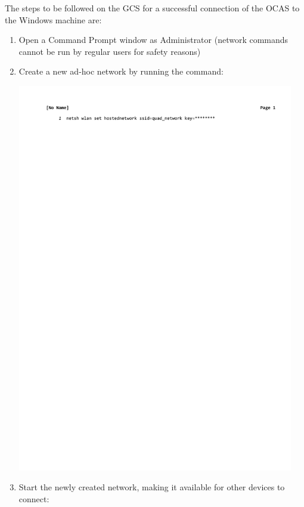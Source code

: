 The steps to be followed on the GCS for a successful connection of the OCAS to the Windows machine are:
\begin{enumerate}
	\item Open a Command Prompt window as Administrator (network commands cannot be run by regular users for safety reasons)

	\item Create a new ad-hoc network by running the command: 

		\hspace{0.05\textwidth}\includegraphics[width=0.95\textwidth,clip,trim={3.5cm 27cm 0 2.3cm}]{./files/setnetwork.pdf}

	\item Start the newly created network, making it available for other devices to connect:


\end{enumerate}
